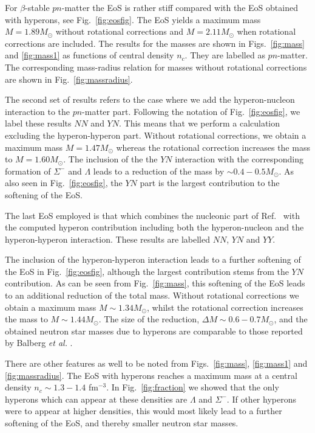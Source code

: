 For $\beta$-stable $pn$-matter 
the EoS is rather stiff compared
with the EoS obtained with hyperons, see Fig.\ \ref{fig:eosfig}.
The EoS yields a maximum mass $M= 1.89M_\odot$ without
rotational corrections and $M=2.11M_\odot$ when rotational
corrections are included. The results for the masses are shown
in Figs.\ \ref{fig:mass} and \ref{fig:mass1}
as functions of central density $n_c$.
They are labelled as $pn$-matter.
The corresponding mass-radius relation for masses without rotational
corrections are shown in Fig.~\ref{fig:massradius}.

The second set of results refers to the case where we add the 
hyperon-nucleon interaction to the $pn$-matter part. 
Following the notation of Fig.~\ref{fig:eosfig}, we label these results
$NN$ and $YN$.
This means that we perform a calculation excluding the 
hyperon-hyperon part.
Without rotational corrections, we obtain
a maximum mass $M=1.47M_\odot$ whereas the rotational correction 
increases the mass to  $M= 1.60 M_\odot$. 
The inclusion of the the $YN$ interaction with the corresponding 
formation of $\Sigma^-$ and $\Lambda$ leads to a reduction 
of the mass by $\sim 0.4-0.5 M_{\odot}$. As also seen in 
Fig.~\ref{fig:eosfig}, the $YN$ part is the largest contribution to the 
softening of the 
EoS.

          
The last EoS employed is that which combines the nucleonic
part of Ref.\ \cite{apr98} with the computed hyperon 
contribution including both the hyperon-nucleon and 
the hyperon-hyperon interaction. 
These results are labelled $NN$, $YN$ and $YY$.

The inclusion of the hyperon-hyperon interaction leads
to a further softening of the EoS in Fig.~\ref{fig:eosfig}, although
the largest contribution stems from the $YN$ contribution.
As can be seen from Fig.\ \ref{fig:mass}, 
this softening
of the EoS leads to an 
additional 
reduction of the total mass. 
Without rotational corrections we obtain
a maximum mass $M\sim 1.34M_\odot$, whilst the rotational correction 
increases the mass to  $M\sim 1.44 M_\odot$. The size of the 
reduction, $\Delta M\sim 0.6-0.7M_\odot$, and the obtained 
neutron star masses due to hyperons are comparable
to those reported by Balberg {\em et al.} \cite{blc99}. 


There are other features as well to be noted from Figs.\ \ref{fig:mass},
\ref{fig:mass1} and \ref{fig:massradius}.
The EoS with hyperons reaches a maximum mass at a central density 
$n_c\sim 1.3-1.4$ fm$^{-3}$. In Fig.\ \ref{fig:fraction} 
we showed that the only hyperons which can appear at these densities
are $\Lambda$ and $\Sigma^-$.
If other hyperons were to appear at higher
densities, this would most likely lead to a further softening of the EoS, and 
thereby smaller neutron star masses. 

